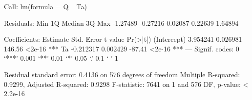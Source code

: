 
Call:
lm(formula = Q ~ Ta)

Residuals:
     Min       1Q   Median       3Q      Max 
-1.27489 -0.27216  0.02087  0.22639  1.64894 

Coefficients:
             Estimate Std. Error t value Pr(>|t|)    
(Intercept)  3.954241   0.026981  146.56   <2e-16 ***
Ta          -0.212317   0.002429  -87.41   <2e-16 ***
---
Signif. codes:  0 ‘***’ 0.001 ‘**’ 0.01 ‘*’ 0.05 ‘.’ 0.1 ‘ ’ 1 

Residual standard error: 0.4136 on 576 degrees of freedom
Multiple R-squared: 0.9299,	Adjusted R-squared: 0.9298 
F-statistic:  7641 on 1 and 576 DF,  p-value: < 2.2e-16 

